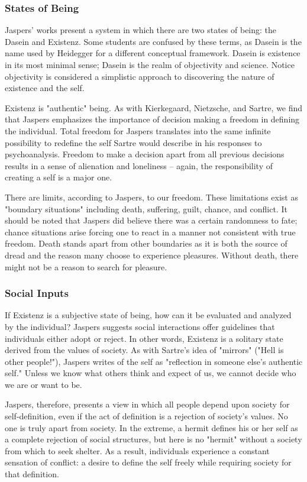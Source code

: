 \documentclass[12pt]{article}
\begin{document}
\subsubsection{States of Being}
Jaspers' works present a system in which there are two states of being: the Dasein and Existenz. Some students are confused by
these terms, as Dasein is the name used by Heidegger for a different conceptual framework. Dasein is existence in its most
minimal sense; Dasein is the realm of objectivity and science. Notice objectivity is considered a simplistic approach to
discovering the nature of existence and the self. 

Existenz is "authentic" being. As with Kierkegaard, Nietzsche, and Sartre, we find that Jaspers emphasizes the importance of
decision making a freedom in defining the individual. Total freedom for Jaspers translates into the same infinite possibility to
redefine the self Sartre would describe in his responses to psychoanalysis. Freedom to make a decision apart from all previous
decisions results in a sense of alienation and loneliness -- again, the responsibility of creating a self is a major one. 

There are limits, according to Jaspers, to our freedom. These limitations exist as "boundary situations" including death, suffering,
guilt, chance, and conflict. It should be noted that Jaspers did believe there was a certain randomness to fate; chance situations
arise forcing one to react in a manner not consistent with true freedom. Death stands apart from other boundaries as it is both
the source of dread and the reason many choose to experience pleasures. Without death, there might not be a reason to search for
pleasure. 

\subsubsection{Social Inputs}
If Existenz is a subjective state of being, how can it be evaluated and analyzed by the individual? Jaspers suggests social
interactions offer guidelines that individuals either adopt or reject. In other words, Existenz is a solitary state derived from the
values of society. As with Sartre's idea of "mirrors" ("Hell is other people!"), Jaspers writes of the self as "reflection in someone
else's authentic self." Unless we know what others think and expect of us, we cannot decide who we are or want to be. 

Jaspers, therefore, presents a view in which all people depend upon society for self-definition, even if the act of definition is a
rejection of society's values. No one is truly apart from society. In the extreme, a hermit defines his or her self as a complete
rejection of social structures, but here is no "hermit" without a society from which to seek shelter. As a result, individuals
experience a constant sensation of conflict: a desire to define the self freely while requiring society for that definition. 
\end{document}
